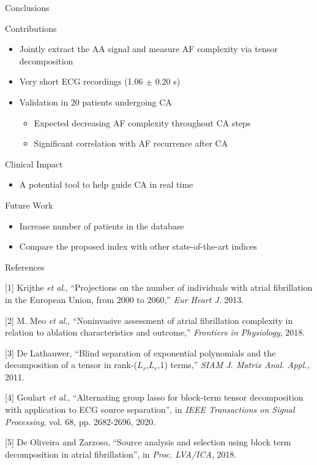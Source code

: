 \documentclass{beamer}
\begin{document}
	\begin{frame}{Conclusions} 
		
		\begin{block}{Contributions}
			\begin{itemize}
				\item Jointly extract the AA signal and measure AF complexity via tensor decomposition
				\item Very short ECG recordings (1.06 $\pm$ 0.20 s)
				\item Validation in 20 patients undergoing CA
				\begin{itemize}
					\item Expected decreasing AF complexity throughout CA steps
					\item Significant correlation with AF recurrence after CA
				\end{itemize}
			\end{itemize}
		\end{block}
		
		\begin{block}{Clinical Impact}
			\begin{itemize}
				\item A potential tool to help guide CA in real time
			\end{itemize}
		\end{block}

		\begin{block}{Future Work}
			\begin{itemize}
				\item Increase number of patients in the database
				\item Compare the proposed index with other state-of-the-art indices
			\end{itemize}
		\end{block}
		
	\end{frame}
	
	\begin{frame}{References}
		
		[1] Krijthe \textit{et al}., ``Projections on the number of individuals with atrial fibrillation in the European Union, from 2000 to 2060,'' \textit{Eur Heart J}. 2013.

		[2]	M. Meo \textit{et al}., ``Noninvasive assessment of atrial fibrillation complexity in relation to ablation characteristics and outcome,'' \textit{Frontiers in Physiology}, 2018.

		[3] De Lathauwer, ``Blind separation of exponential polynomials and the decomposition of a tensor in rank-($L_{r}$,$L_{r}$,1) terms,'' \textit{SIAM J. Matrix Anal. Appl.}, 2011.

		[4] Goulart \textit{et al}., ``Alternating group lasso for block-term tensor decomposition with application to ECG source separation'', in \textit{IEEE Transactions on Signal Processing}, vol. 68, pp. 2682-2696, 2020.
		
		[5] De Oliveira and Zarzoso, ``Source analysis and selection using block term decomposition in atrial fibrillation'', in \textit{Proc. LVA/ICA}, 2018.
	\end{frame}
	
\end{document}
